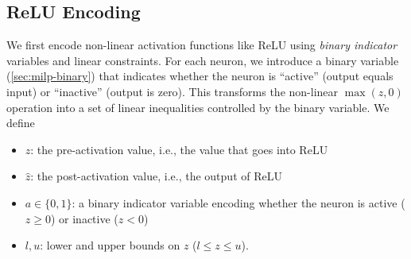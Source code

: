 \documentclass[oneside,11pt,dvipsnames]{book}
\numberwithin{equation}{section}
\theoremstyle{definition}
\theoremstyle{remark}
\begin{document}




\subsection{ReLU Encoding}\label{sec:relu-encoding}

We first encode non-linear activation functions like ReLU using \emph {binary indicator} variables and linear constraints. For each neuron, we introduce a binary variable (\autoref{sec:milp-binary}) that indicates whether the neuron is ``active'' (output equals input) or ``inactive'' (output is zero). This transforms the non-linear $\max(z,0)$ operation into a set of linear inequalities controlled by the binary variable.
We define

\begin{itemize}
    \item $z$: the pre-activation value, i.e., the value that goes into ReLU
    \item $\hat{z}$: the post-activation value, i.e., the output of ReLU
    \item $a \in \{0,1\}$: a binary indicator variable encoding whether the neuron is active ($z \ge 0$) or inactive ($z < 0$)
    \item $l, u$: lower and upper bounds on $z$ ($l \leq z \leq u$).
\end{itemize}
\end{document}
